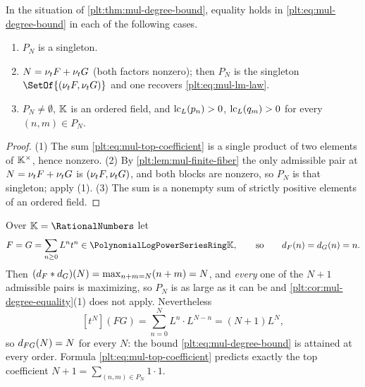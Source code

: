 \begin{corollary}
\label{plt:cor:mul-degree-equality}
In the situation of \cref{plt:thm:mul-degree-bound}, equality holds in
\eqref{plt:eq:mul-degree-bound} in each of the following cases.
\begin{enumerate}
\item $P_N$ is a singleton.
\item $N=\nu_{t} F+\nu_{t} G$ (both factors nonzero); then $P_N$ is the
singleton $\SetOf{(\ordt F,\ordt G)}$ and one recovers
\eqref{plt:eq:mul-lm-law}.
\item $P_N\ne\emptyset$, $\mathbb{K}$ is an ordered field, and $\operatorname{lc}_L(p_n)>0$,
$\operatorname{lc}_L(q_m)>0$ for every $(n,m)\in P_N$.
\end{enumerate}
\end{corollary}

\begin{proof}
(1) The sum \eqref{plt:eq:mul-top-coefficient} is a single product of two
elements of $\mathbb{K}^\times$, hence nonzero.  (2) By
\cref{plt:lem:mul-finite-fiber} the only admissible pair at
$N=\nu_{t} F+\nu_{t} G$ is $(\nu_{t} F,\nu_{t} G)$, and both blocks are nonzero, so
$P_N$ is that singleton; apply (1).  (3) The sum is a nonempty sum of
strictly positive elements of an ordered field.
\end{proof}

\begin{example}
\label{plt:ex:mul-degree-sharp}
Over $\K=\RationalNumbers$ let
\[
 F=G=\sum_{n\ge0}L^nt^n\in\PLpow,
 \qquad\text{so}\qquad
 \dprofile{F}(n)=\dprofile{G}(n)=n .
\]
Then $(d_{F}\ast d_{G})(N)=\max_{n+m=N}(n+m)=N$, and
\emph{every} one of the $N+1$ admissible pairs is maximizing, so $P_N$ is as
large as it can be and \cref{plt:cor:mul-degree-equality}(1) does not apply.
Nevertheless
\[
 [t^N](FG)=\sum_{n=0}^{N}L^n\cdot L^{N-n}=(N+1)L^N,
\]
so $d_{FG}(N)=N$ for every $N$: the bound
\eqref{plt:eq:mul-degree-bound} is attained at every order.  Formula
\eqref{plt:eq:mul-top-coefficient} predicts exactly the top coefficient
$N+1=\sum_{(n,m)\in P_N}1\cdot1$.
\end{example}

